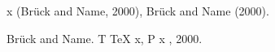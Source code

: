 x (Br{\"u}ck {and} \alpha{} Name, 2000), Br{\"u}ck {and} \alpha{} Name (2000).

\noindent
Br{\"u}ck {and} \alpha{} Name. T {\TeX} \alpha{} x, P {x} \beta{}, 2000.
